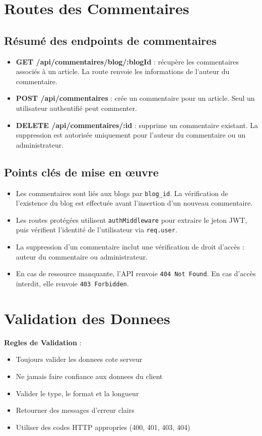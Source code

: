 \documentclass[a4paper,12pt]{book}
\begin{document}
\section{Routes des Commentaires}

\subsection{Résumé des endpoints de commentaires}
\begin{itemize}
    \item \textbf{GET /api/commentaires/blog/:blogId} : récupère les commentaires associés à un article. La route renvoie les informations de l'auteur du commentaire.
    \item \textbf{POST /api/commentaires} : crée un commentaire pour un article. Seul un utilisateur authentifié peut commenter.
    \item \textbf{DELETE /api/commentaires/:id} : supprime un commentaire existant. La suppression est autorisée uniquement pour l'auteur du commentaire ou un administrateur.
\end{itemize}

\subsection{Points clés de mise en œuvre}
\begin{itemize}
    \item Les commentaires sont liés aux blogs par \texttt{blog_id}. La vérification de l'existence du blog est effectuée avant l'insertion d'un nouveau commentaire.
    \item Les routes protégées utilisent \texttt{authMiddleware} pour extraire le jeton JWT, puis vérifient l'identité de l'utilisateur via \texttt{req.user}.
    \item La suppression d'un commentaire inclut une vérification de droit d'accès : auteur du commentaire ou administrateur.
    \item En cas de ressource manquante, l'API renvoie \texttt{404 Not Found}. En cas d'accès interdit, elle renvoie \texttt{403 Forbidden}.
\end{itemize}

\section{Validation des Donnees}

\begin{bestpracticebox}
    \textbf{Regles de Validation} :
    \begin{itemize}
        \item Toujours valider les donnees cote serveur
        \item Ne jamais faire confiance aux donnees du client
        \item Valider le type, le format et la longueur
        \item Retourner des messages d'erreur clairs
        \item Utiliser des codes HTTP appropries (400, 401, 403, 404)
    \end{itemize}
\end{bestpracticebox}
\end{document}
